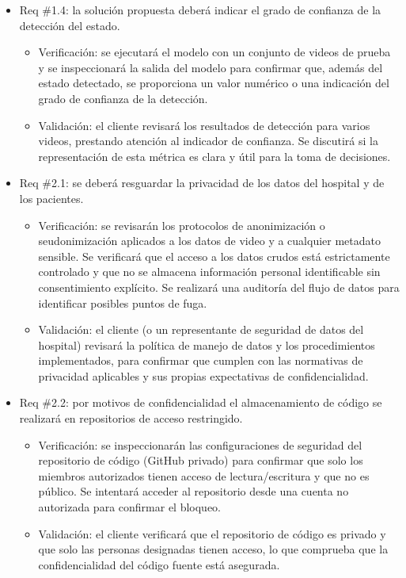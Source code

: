 \documentclass[
11pt, %
]{charter}
\begin{document}
\begin{itemize}
	\item Req \#1.4: la solución propuesta deberá indicar el grado de confianza de la detección del estado.
	\begin{itemize}
		\item Verificación: se ejecutará el modelo con un conjunto de videos de prueba y se inspeccionará la salida del modelo para confirmar que, además del estado detectado, se proporciona un valor numérico o una indicación del grado de confianza de la detección.
		\item Validación: el cliente revisará los resultados de detección para varios videos, prestando atención al indicador de confianza. Se discutirá si la representación de esta métrica es clara y útil para la toma de decisiones.
	\end{itemize}
	
	\pagebreak
	
	\item Req \#2.1: se deberá resguardar la privacidad de los datos del hospital y de los pacientes.
	\begin{itemize}
		\item Verificación: se revisarán los protocolos de anonimización o seudonimización aplicados a los datos de video y a cualquier metadato sensible. Se verificará que el acceso a los datos crudos está estrictamente controlado y que no se almacena información personal identificable sin consentimiento explícito. Se realizará una auditoría del flujo de datos para identificar posibles puntos de fuga.
		\item Validación: el cliente (o un representante de seguridad de datos del hospital) revisará la política de manejo de datos y los procedimientos implementados, para confirmar que cumplen con las normativas de privacidad aplicables y sus propias expectativas de confidencialidad.
	\end{itemize}
	
	\item Req \#2.2: por motivos de confidencialidad el almacenamiento de código se realizará en repositorios de acceso restringido.
	\begin{itemize}
		\item Verificación: se inspeccionarán las configuraciones de seguridad del repositorio de código (GitHub privado) para confirmar que solo los miembros autorizados tienen acceso de lectura/escritura y que no es público. Se intentará acceder al repositorio desde una cuenta no autorizada para confirmar el bloqueo.
		\item Validación: el cliente verificará que el repositorio de código es privado y que solo las personas designadas tienen acceso, lo que comprueba que la confidencialidad del código fuente está asegurada.
	\end{itemize}
	

\end{itemize}
\end{document}
